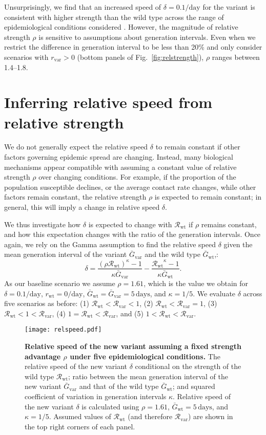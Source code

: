 \documentclass[12pt]{article}
\newcommand{\fref}[1]{Fig.~\ref{fig:#1}}
\newcommand{\vvvar}{\mathrm{var}}
\newcommand{\wwwt}{\mathrm{wt}}
\newcommand{\rx}[1]{\ensuremath{{r}_{#1}}\xspace}
\newcommand{\rw}{\rx{\wwwt}}
\newcommand{\rv}{\rx{\vvvar}}
\newcommand{\Rx}[1]{\ensuremath{{\mathcal R}_{#1}}\xspace}
\newcommand{\Rw}{\Rx{\wwwt}}
\newcommand{\Rv}{\Rx{\vvvar}}
\newcommand{\days}{\ensuremath{\, \textrm{days}}}
\newcommand{\pday}{\ensuremath{/\textrm{day}}}
\newcommand{\Gx}[1]{\ensuremath{{\bar G}_{#1}}\xspace}
\newcommand{\Gw}{\Gx{\wwwt}}
\newcommand{\Gv}{\Gx{\vvvar}}
\begin{document}
Unsurprisingly, we find that an increased speed of $\delta=0.1\pday$ for the variant is consistent with higher strength than the wild type across the range of epidemiological conditions considered \citep{switzerland2021variant, davies2021estimated, di2021impact, graham2021changes, leung2021early, volz2021transmission,zhao2021}.
However, the magnitude of relative strength $\rho$ is sensitive to assumptions about generation intervals.
Even when we restrict the difference in generation interval to be less than 20\% and only consider scenarios with $\rv>0$ (bottom panels of \fref{relstrength}), $\rho$ ranges between 1.4--1.8.

\section{Inferring relative speed from relative strength}

We do not generally expect the relative speed $\delta$ to remain constant if other factors governing epidemic spread are changing.
Instead, many biological mechanisms appear compatible with assuming a constant value of relative strength $\rho$ over changing conditions.
For example, if the proportion of the population susceptible declines, or the average contact rate changes, while other factors remain constant, the relative strength $\rho$ is expected to remain constant; 
in general, this will imply a change in relative speed $\delta$.

We thus investigate how $\delta$ is expected to change with \Rw if $\rho$ remains constant, and how this expectation changes with the ratio of the generation intervals. 
Once again, we rely on the Gamma assumption to find the relative speed $\delta$ given the mean generation interval of the variant $\Gv$ and the wild type $\Gw$,:
\begin{equation}
\delta = \frac{(\rho \Rw)^{\kappa} - 1}{\kappa \Gv} - \frac{\Rw^{\kappa} - 1}{\kappa \Gw}.
\end{equation}
As our baseline scenario we assume $\rho = 1.61$, which is the value we obtain for $\delta=0.1\pday$, $\rw=0\pday$, $\Gw = \Gv = 5\,\textrm{days}$, and $\kappa = 1/5$.
We evaluate $\delta$ across five scenarios as before: (1) $\Rw < \Rv < 1$, (2) $\Rw < \Rv = 1$, (3) $\Rw < 1 < \Rv$, (4) $1 = \Rw < \Rv$, and (5) $1 < \Rw < \Rv$.

\begin{figure}[!th]
\texttt{[image: relspeed.pdf]}
\caption{
\textbf{Relative speed of the new variant assuming a fixed strength advantage $\rho$ under five epidemiological conditions.}
The relative speed of the new variant $\delta$ conditional on the strength of the wild type $\Rw$; ratio between the mean generation interval of the new variant $\Gv$ and that of the wild type $\Gw$; and squared coefficient of variation in generation intervals $\kappa$.
Relative speed of the new variant $\delta$ is calculated using $\rho=1.61$, $\Gw = 5\days$, and $\kappa = 1/5$.
Assumed values of $\Rw$ (and therefore $\Rv$) are shown in the top right corners of each panel.
}
\label{fig:relspeed}
\end{figure}
\end{document}
